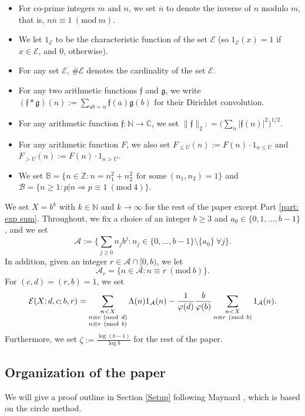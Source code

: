\documentclass[12pt]{amsart}
\numberwithin{equation}{section}
\theoremstyle{remark}
\theoremstyle{definition}
\newcommand{\imod}[1]{\ (\mathrm{mod}\ #1)}
\begin{document}
\begin{itemize}
\item For co-prime integers $m$ and $n$, we set $\overline{n}$ to denote the inverse of $n$ modulo $m$, that is, $n\overline{n}\equiv 1\imod m$.
\item We let $1_\mathcal{E}$ to be the characteristic function of the set $\mathcal{E}$ (so $1_{\mathcal{E}}(x)=1$ if $x\in \mathcal{E}$, and $0$, otherwise).
\item For any set $\mathcal{E}$, $\#\mathcal{E}$ denotes the cardinality of the set $\mathcal{E}$.
\item For any two arithmetic functions $\mathfrak{f}$ and $\mathfrak{g}$, we write $(\mathfrak{f}*\mathfrak{g})(n):= \sum_{ab=n}\mathfrak{f}(a)\mathfrak{g}(b)$ for their Dirichlet convolution.
\item For any arithmetic function $\mathfrak{f}:\mathbb{N}\rightarrow \mathbb{C}$, we set $\lVert \mathfrak{f}\rVert_2: = \big(\sum_{n}|\mathfrak{f}(n)|^2\big)^{1/2}$.
\item For any arithmetic function $F$, we also set $F_{\leq U}(n):=F(n)\cdot 1_{n\leq U}$ and $F_{>U}(n):=F(n)\cdot 1_{n>U}$.
\item We set $\mathbb{B}=\{n\in \mathbb{Z}: n=n_1^2+n_2^2~~\text{for some}~(n_1, n_2)=1\}$ and $\mathcal{B}=\{n\geq 1: p|n\Rightarrow p\equiv 1\imod 4\}$.
\end{itemize}

We set $X=b^k$ with $k\in \mathbb{N}$ and $k\rightarrow \infty$ for the rest of the paper except Part \ref{part: exp sum}. Throughout, we fix a choice of an integer $b\geq 3$ and $a_0\in\{0,1,\dotsc,b-1\}$, and we set
\[\mathcal{A}:=\bigg\{\sum_{j\geq 0}n_jb^j: n_j\in \{0, \dotsc, b-1\}\setminus \{a_0\}\: \forall j \bigg\}.\]
In addition, given an integer $r\in \mathcal{A}\cap [0, b)$, we let
\[\mathcal{A}_r=\{n\in \mathcal{A}: n\equiv r\imod b\}.\]
For $(c,d)=(r,b)=1$, we set
\begin{align}
\notag \mathcal{E}(X;d,c;b,r)=\sum_{\substack{n < X\\n\equiv c \imod d\\n\equiv r\imod b}}\Lambda(n)1_{\mathcal{A}}(n) - \dfrac{1}{\varphi(d)}\dfrac{b}{\varphi(b)}\sum_{\substack{n<X\\n\equiv r\imod b}}1_{\mathcal{A}}(n).
\end{align}
Furthermore, we set $\zeta := \frac{\log (b-1)}{\log b}$ for the rest of the paper.


\subsection*{Organization of the paper}
We will give a proof outline in Section \ref{Setup} following Maynard \cite{May2}, which is based on the circle method.
\end{document}
